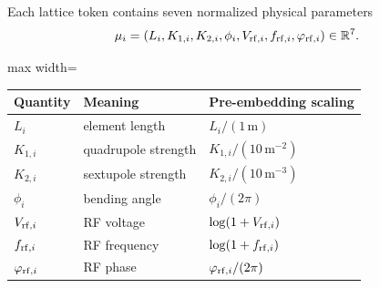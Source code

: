 \begin{frame}[t,shrink=5]{Each lattice token contains seven normalized physical parameters}
\[\mu_i=(L_i,K_{1,i},K_{2,i},\phi_i,V_{{\rm rf},i},f_{{\rm rf},i},\varphi_{{\rm rf},i})\in\mathbb R^7.\]\begin{center}\begin{adjustbox}{max width=\linewidth}
\begin{tabular}{lll}\toprule Quantity & Meaning & Pre-embedding scaling\\\midrule
$L_i$ & element length & $L_i/(1\,\mathrm m)$\\
$K_{1,i}$ & quadrupole strength & $K_{1,i}/(10\,\mathrm m^{-2})$\\
$K_{2,i}$ & sextupole strength & $K_{2,i}/(10\,\mathrm m^{-3})$\\
$\phi_i$ & bending angle & $\phi_i/(2\pi)$\\
$V_{{\rm rf},i}$ & RF voltage & $\log(1+V_{{\rm rf},i})$\\
$f_{{\rm rf},i}$ & RF frequency & $\log(1+f_{{\rm rf},i})$\\
$\varphi_{{\rm rf},i}$ & RF phase & $\varphi_{{\rm rf},i}/(2\pi)$\\\bottomrule\end{tabular}
\end{adjustbox}\end{center}

\end{frame}


